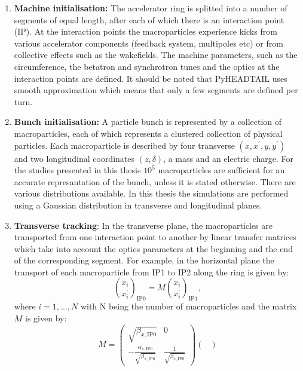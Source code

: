 {{\begin{enumerate}
    \item \textbf{Machine initialisation:} The accelerator ring is splitted into a number of segments of equal length, after each of which there is an interaction point (IP). At the interaction points the macroparticles experience kicks from various accelerator components (feedback system, multipoles etc) or from collective effects such as the wakefields. The machine parameters, such as the circumference, the betatron and synchrotron tunes and the optics at the interaction points are defined. It should be noted that PyHEADTAIL uses smooth approximation which means that only a few segments are defined per turn. %
    \item \textbf{Bunch initialisation:}  A particle bunch is represented by a collection of macroparticles, each of which represents a clustered collection of physical particles. Each macroparticle is described by four transverse $(x, x^\prime, y, y^\prime)$ and two longitudinal coordinates $(z, \delta)$, a mass and an electric charge. For the studies presented in this thesis $10^{5}$ macroparticles are sufficient for an accurate represantation of the bunch, unless it is stated otherwise. There are various distributions available. In this thesis the simulations are performed using a Gaussian distribution in transverse and longitudinal planes.
    \item \textbf{Transverse tracking}: In the transverse plane, the macroparticles are transported from one interaction point to another by linear transfer matrices which take into account the optics parameters at the beginning and the end of the corresponding segment. For example, in the horizontal plane the transport of each macroparticle from IP1 to IP2 along the ring is given by:
    \begin{equation}
        \binom{x_i}{x_i^\prime}_{\mathrm{IP0}} = M \binom{x_i}{x_i^\prime}_{\mathrm{IP1}},
    \end{equation}
    where $i=1, ..., N$ with N being the number of macroparticles and the matrix $M$ is given by:
    \begin{equation}\label{eq:linear_transfer_map}
        M = \begin{pmatrix}
            \sqrt{\beta_{x, \mathrm{IP0}}} & 0 \\ 
            -\frac{\alpha_{x, \mathrm{IP0}}}{\sqrt{\beta_{x,  \mathrm{IP0} }}} & \frac{1}{\sqrt{\beta_{x, \mathrm{IP0}}}}
            \end{pmatrix} \begin{pmatrix}

\end{pmatrix}
\end{equation}
\end{enumerate}}}
